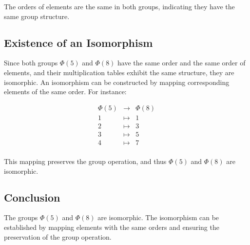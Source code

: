 \documentclass[12pt]{amsart}
\theoremstyle{definition}
\numberwithin{equation}{section}
\begin{document}
\begin{exercise}{1}
    The orders of elements are the same in both groups, indicating they have the same group structure.
    
    \subsection*{Existence of an Isomorphism}
    
    Since both groups \(\Phi(5)\) and \(\Phi(8)\) have the same order and the same order of elements, and their multiplication tables exhibit the same structure, they are isomorphic. An isomorphism can be constructed by mapping corresponding elements of the same order. For instance:
    
    \[
    \begin{array}{ccc}
      \Phi(5) & \rightarrow & \Phi(8) \\
      1 & \mapsto & 1 \\
      2 & \mapsto & 3 \\
      3 & \mapsto & 5 \\
      4 & \mapsto & 7 \\
    \end{array}
    \]
    
    This mapping preserves the group operation, and thus \(\Phi(5)\) and \(\Phi(8)\) are isomorphic.
    
    \subsection*{Conclusion}
    
    The groups \(\Phi(5)\) and \(\Phi(8)\) are isomorphic. The isomorphism can be established by mapping elements with the same orders and ensuring the preservation of the group operation.
    
    \end{exercise}
    \newpage
    
\end{document}
